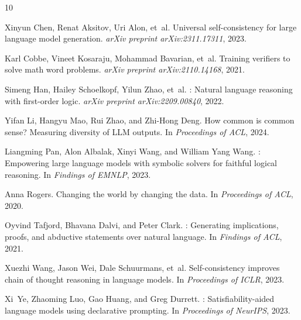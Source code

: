 \documentclass[11pt,a4paper]{article}
\begin{document}
\begin{thebibliography}{10}

Xinyun Chen, Renat Aksitov, Uri Alon, et~al.
\newblock Universal self-consistency for large language model generation.
\newblock \emph{arXiv preprint arXiv:2311.17311}, 2023.

Karl Cobbe, Vineet Kosaraju, Mohammad Bavarian, et~al.
\newblock Training verifiers to solve math word problems.
\newblock \emph{arXiv preprint arXiv:2110.14168}, 2021.

Simeng Han, Hailey Schoelkopf, Yilun Zhao, et~al.
: Natural language reasoning with first-order logic.
\newblock \emph{arXiv preprint arXiv:2209.00840}, 2022.

Yifan Li, Hangyu Mao, Rui Zhao, and Zhi-Hong Deng.
\newblock How common is common sense? {M}easuring diversity of {LLM} outputs.
\newblock In \emph{Proceedings of ACL}, 2024.

Liangming Pan, Alon Albalak, Xinyi Wang, and William Yang Wang.
: Empowering large language models with symbolic solvers for faithful logical reasoning.
\newblock In \emph{Findings of EMNLP}, 2023.

Anna Rogers.
\newblock Changing the world by changing the data.
\newblock In \emph{Proceedings of ACL}, 2020.

Oyvind Tafjord, Bhavana Dalvi, and Peter Clark.
: Generating implications, proofs, and abductive statements over natural language.
\newblock In \emph{Findings of ACL}, 2021.

Xuezhi Wang, Jason Wei, Dale Schuurmans, et~al.
\newblock Self-consistency improves chain of thought reasoning in language models.
\newblock In \emph{Proceedings of ICLR}, 2023.

Xi~Ye, Zhaoming Luo, Gao Huang, and Greg Durrett.
: Satisfiability-aided language models using declarative prompting.
\newblock In \emph{Proceedings of NeurIPS}, 2023.

\end{thebibliography}
\end{document}
